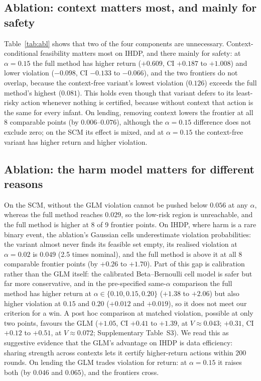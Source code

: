 \documentclass[10pt,a4paper]{article}
\begin{document}
\subsection*{Ablation: context matters most, and mainly for safety}
Table~\ref{tab:abl} shows that two of the four components are unnecessary. Context-conditional feasibility matters most on IHDP, and there mainly for safety: at
$\alpha=0.15$ the full method has higher return ($+0.609$, CI $+0.187$ to $+1.008$) and lower violation
($-0.098$, CI $-0.133$ to $-0.066$), and the two frontiers do not overlap, because the context-free
variant's lowest violation ($0.126$) exceeds the full method's highest ($0.081$). This holds even though
that variant defers to its least-risky action whenever nothing is certified, because without context
that action is the same for every infant. On lending, removing context lowers the frontier at all 8
comparable points (by $0.006$--$0.076$), although the $\alpha=0.15$ difference does not exclude zero;
on the SCM its effect is mixed, and at $\alpha=0.15$ the context-free variant has higher return and
higher violation.

\subsection*{Ablation: the harm model matters for different reasons}
On the SCM, without the GLM violation cannot be pushed below $0.056$ at any $\alpha$, whereas the full
method reaches $0.029$, so the low-risk region is unreachable, and the full method is higher at 8 of 9
frontier points. On IHDP, where harm is a rare binary event, the ablation's Gaussian cells underestimate
violation probabilities: the variant almost never finds its feasible set empty, its realised violation
at $\alpha=0.02$ is $0.049$ (2.5 times nominal), and the full method is above it at all 8 comparable
frontier points (by $+0.26$ to $+1.70$). Part of this gap is calibration rather than the GLM itself:
the calibrated Beta--Bernoulli cell model is safer but far more conservative, and in the pre-specified
same-$\alpha$ comparison the full method has higher return at $\alpha\in\{0.10,0.15,0.20\}$ ($+1.38$
to $+2.06$) but also higher violation at $0.15$ and $0.20$ ($+0.012$ and $+0.019$), so it does not meet
our criterion for a win. A post hoc comparison at matched violation, possible at only two points,
favours the GLM ($+1.05$, CI $+0.41$ to $+1.39$, at $V\approx0.043$; $+0.31$, CI $+0.12$ to $+0.51$, at
$V\approx0.072$; Supplementary Table~S3). We read this as suggestive evidence that the GLM's advantage
on IHDP is data efficiency: sharing strength across contexts lets it certify higher-return actions
within 200 rounds. On lending the GLM trades violation for return: at $\alpha=0.15$ it raises both (by
$0.046$ and $0.065$), and the frontiers cross.
\end{document}
